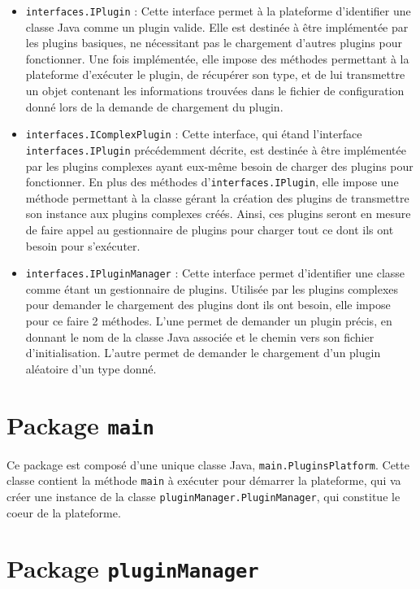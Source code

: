 \documentclass[a4paper]{report}
\begin{document}
\begin{itemize}
	\item \texttt{interfaces.IPlugin} : Cette interface permet à la plateforme d'identifier une classe Java comme un plugin valide. Elle est destinée à être implémentée par les plugins basiques, ne nécessitant pas le chargement d'autres plugins pour fonctionner. Une fois implémentée, elle impose des méthodes permettant à la plateforme d'exécuter le plugin, de récupérer son type, et de lui transmettre un objet contenant les informations trouvées dans le fichier de configuration donné lors de la demande de chargement du plugin.
	\item \texttt{interfaces.IComplexPlugin} : Cette interface, qui étand l'interface \texttt{interfaces.IPlugin} précédemment décrite, est destinée à être implémentée par les plugins complexes ayant eux-même besoin de charger des plugins pour fonctionner. En plus des méthodes d'\texttt{interfaces.IPlugin}, elle impose une méthode permettant à la classe gérant la création des plugins de transmettre son instance aux plugins complexes créés. Ainsi, ces plugins seront en mesure de faire appel au gestionnaire de plugins pour charger tout ce dont ils ont besoin pour s'exécuter.
	\item \texttt{interfaces.IPluginManager} :  Cette interface permet d'identifier une classe comme étant un gestionnaire de plugins. Utilisée par les plugins complexes pour demander le chargement des plugins dont ils ont besoin, elle impose pour ce faire 2 méthodes. L'une permet de demander un plugin précis, en donnant le nom de la classe Java associée et le chemin vers son fichier d'initialisation. L'autre permet de demander le chargement d'un plugin aléatoire d'un type donné.
\end{itemize}

\section{Package \texttt{main}}

Ce package est composé d'une unique classe Java, \texttt{main.PluginsPlatform}. Cette classe contient la méthode \texttt{main} à exécuter pour démarrer la plateforme, qui va créer une instance de la classe \texttt{pluginManager.PluginManager}, qui constitue le coeur de la plateforme.

\section{Package \texttt{pluginManager}}
\end{document}
